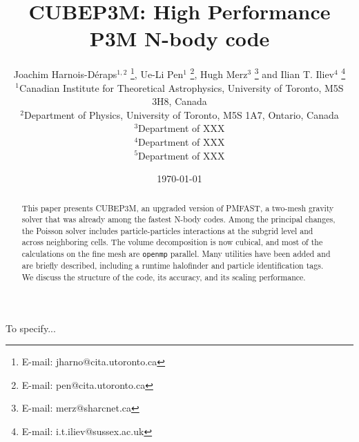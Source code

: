 \documentclass[useAMS,usenatbib]{mn2e}
\title[{\small} CUBEP3M: High Performance P3M N-body code]{{\small} CUBEP3M: High Performance P3M N-body code}
\author[Joachim Harnois-D\'{e}raps, Ue-Li Pen, Hugh Merz, Ilian T. Iliev]{Joachim Harnois-D\'{e}raps$^{1,2}$ 
\thanks{E-mail: jharno@cita.utoronto.ca},  Ue-Li Pen$^{1}$ \thanks{E-mail: pen@cita.utoronto.ca}, 
Hugh Merz$^{3}$ \thanks{E-mail: merz@sharcnet.ca} and  Ilian T. Iliev$^{4}$ \thanks{E-mail: i.t.iliev@sussex.ac.uk}\\
$^{1}$Canadian Institute for Theoretical Astrophysics, University of
Toronto, M5S 3H8, Canada\\
$^{2}$Department of Physics, University of Toronto, M5S 1A7, Ontario,  Canada\\
$^{3}$Department of XXX\\
$^{4}$Department of XXX\\
$^{5}$Department of XXX}
\begin{document}
\date{\today}

\pagerange{\pageref{firstpage}--\pageref{lastpage}} 

\maketitle

\label{firstpage}

\begin{abstract}
This paper presents {\small CUBEP3M}, an upgraded version of {\small PMFAST}, 
a two-mesh gravity solver that was already among the fastest N-body codes. 
Among the principal changes, the Poisson solver includes particle-particles interactions
at the subgrid level and across neighboring cells. The volume decomposition is now cubical,
and most of the calculations on the fine mesh are {\tt openmp} parallel.
Many utilities have been added and are briefly described, including a runtime halofinder
and particle identification tags. 
We discuss the structure of the code, its accuracy, and  its scaling performance.
\end{abstract}

\begin{keywords}
To specify...
\end{keywords}









%

{}
%

\bsp

\label{lastpage}
\end{document}
